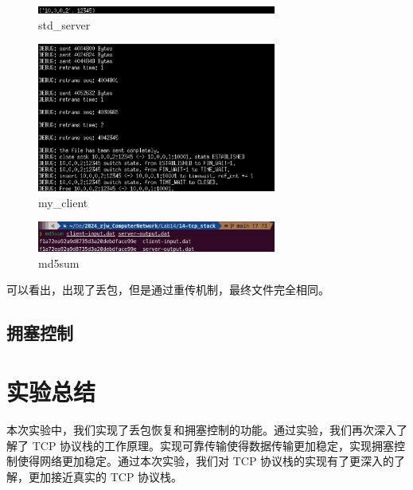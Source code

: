\documentclass[UTF8]{report}
\begin{document}
\begin{enumerate}
    \begin{figure}[H]
        \centering
        \includegraphics[width=0.7\textwidth]{std_server_my_client_h1.png}
        \caption{std\_server}
    \end{figure}

    \begin{figure}[H]
        \centering
        \includegraphics[width=0.7\textwidth]{std_server_my_client_h2.png}
        \caption{my\_client}
    \end{figure}

    \begin{figure}[H]
        \centering
        \includegraphics[width=0.7\textwidth]{std_server_my_client_md5sum.png}
        \caption{md5sum}
    \end{figure}

    可以看出，出现了丢包，但是通过重传机制，最终文件完全相同。
\end{enumerate}

\subsection{拥塞控制}

\section{实验总结}

本次实验中，我们实现了丢包恢复和拥塞控制的功能。通过实验，我们再次深入了解了 TCP 协议栈的工作原理。实现可靠传输使得数据传输更加稳定，实现拥塞控制使得网络更加稳定。通过本次实验，我们对 TCP 协议栈的实现有了更深入的了解，更加接近真实的 TCP 协议栈。
\end{document}
